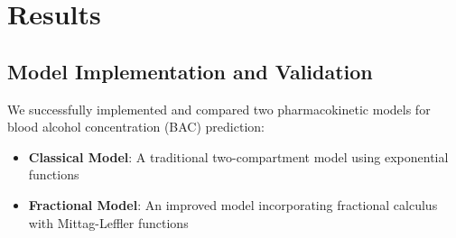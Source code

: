 \documentclass[11pt]{article}
\begin{document}


\section{Results}

\subsection{Model Implementation and Validation}

We successfully implemented and compared two pharmacokinetic models for blood alcohol concentration (BAC) prediction:

\begin{itemize}
    \item \textbf{Classical Model}: A traditional two-compartment model using exponential functions
    \item \textbf{Fractional Model}: An improved model incorporating fractional calculus with Mittag-Leffler functions
\end{itemize}
\end{document}
